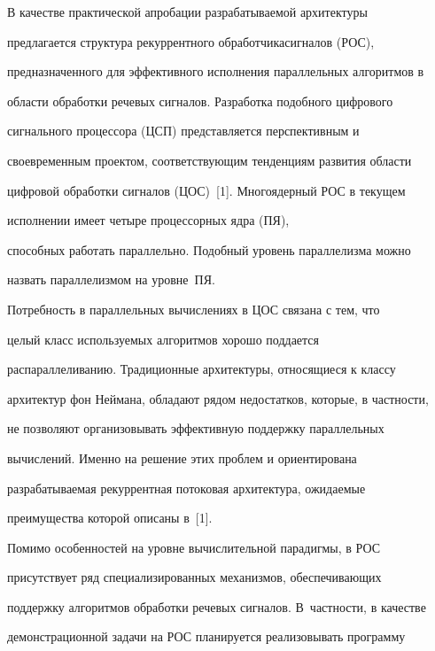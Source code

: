 




      В качестве практической апробации разрабатываемой архитектуры 


предлагается структура рекуррентного обработчика\linebreak сигналов (РОС), 


предназначенного для эффективного исполнения параллельных алгоритмов в 


области обработки речевых сигналов. Разработка подобного цифрового 


сигнального процессора (ЦСП) представляется перспективным и 


своевременным проектом, соответствующим тенденциям развития области 


цифровой обработки сигналов (ЦОС)~[1]. Многоядерный РОС в текущем 


исполнении имеет четыре процессорных ядра (ПЯ), 


способных работать параллельно. Подобный уровень параллелизма можно 


назвать параллелизмом на уровне~ПЯ.


      


      Потребность в параллельных вычислениях в ЦОС связана с тем, что 


целый класс используемых алгоритмов хорошо поддается 


распараллеливанию. Традиционные архитектуры, относящиеся к классу 


архитектур фон Неймана, обладают рядом недостатков, которые, в частности, 


не позволяют организовывать эффективную поддержку параллельных 


вычислений. Именно на решение этих проблем и ориентирована 


разрабатываемая рекуррентная потоковая архитектура, ожидаемые 


преимущества которой описаны в~[1].


      


      Помимо особенностей на уровне вычислительной парадигмы, в РОС 


присутствует ряд специализированных механизмов, обеспечивающих 


поддержку алгоритмов обработки речевых сигналов. В~частности, в качестве 


демонстрационной задачи на РОС планируется реализовывать программу 


